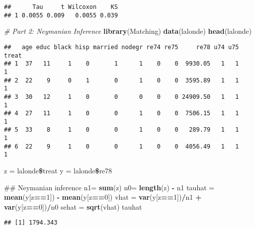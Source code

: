 \documentclass[]{article}
\newenvironment{Shaded}{\begin{snugshade}}{\end{snugshade}}
\newcommand{\KeywordTok}[1]{\textcolor[rgb]{0.13,0.29,0.53}{\textbf{#1}}}
\newcommand{\DecValTok}[1]{\textcolor[rgb]{0.00,0.00,0.81}{#1}}
\newcommand{\StringTok}[1]{\textcolor[rgb]{0.31,0.60,0.02}{#1}}
\newcommand{\CommentTok}[1]{\textcolor[rgb]{0.56,0.35,0.01}{\textit{#1}}}
\newcommand{\OperatorTok}[1]{\textcolor[rgb]{0.81,0.36,0.00}{\textbf{#1}}}
\newcommand{\NormalTok}[1]{#1}
\begin{document}
\begin{verbatim}
##      Tau     t Wilcoxon    KS
## 1 0.0055 0.009   0.0055 0.039
\end{verbatim}

\begin{Shaded}
\begin{Highlighting}[]
\CommentTok{# Part 2: Neymanian Inference}
\KeywordTok{library}\NormalTok{(Matching)}
\KeywordTok{data}\NormalTok{(lalonde)}
\KeywordTok{head}\NormalTok{(lalonde)}
\end{Highlighting}
\end{Shaded}

\begin{verbatim}
##   age educ black hisp married nodegr re74 re75     re78 u74 u75 treat
## 1  37   11     1    0       1      1    0    0  9930.05   1   1     1
## 2  22    9     0    1       0      1    0    0  3595.89   1   1     1
## 3  30   12     1    0       0      0    0    0 24909.50   1   1     1
## 4  27   11     1    0       0      1    0    0  7506.15   1   1     1
## 5  33    8     1    0       0      1    0    0   289.79   1   1     1
## 6  22    9     1    0       0      1    0    0  4056.49   1   1     1
\end{verbatim}

\begin{Shaded}
\begin{Highlighting}[]
\NormalTok{z =}\StringTok{ }\NormalTok{lalonde}\OperatorTok{\$}\NormalTok{treat}
\NormalTok{y =}\StringTok{ }\NormalTok{lalonde}\OperatorTok{\$}\NormalTok{re78}

\NormalTok{## Neymanian inference}
\NormalTok{n1=}\StringTok{ }\KeywordTok{sum}\NormalTok{(z)}
\NormalTok{n0=}\StringTok{ }\KeywordTok{length}\NormalTok{(z) }\OperatorTok{-}\StringTok{ }\NormalTok{n1}
\NormalTok{tauhat =}\StringTok{ }\KeywordTok{mean}\NormalTok{(y[z}\OperatorTok{==}\DecValTok{1}\NormalTok{]) }\OperatorTok{-}\StringTok{ }\KeywordTok{mean}\NormalTok{(y[z}\OperatorTok{==}\DecValTok{0}\NormalTok{])}
\NormalTok{vhat   =}\StringTok{ }\KeywordTok{var}\NormalTok{(y[z}\OperatorTok{==}\DecValTok{1}\NormalTok{])}\OperatorTok{/}\NormalTok{n1 }\OperatorTok{+}\StringTok{ }\KeywordTok{var}\NormalTok{(y[z}\OperatorTok{==}\DecValTok{0}\NormalTok{])}\OperatorTok{/}\NormalTok{n0}
\NormalTok{sehat  =}\StringTok{ }\KeywordTok{sqrt}\NormalTok{(vhat)}
\NormalTok{tauhat}
\end{Highlighting}
\end{Shaded}

\begin{verbatim}
## [1] 1794.343
\end{verbatim}
\end{document}
